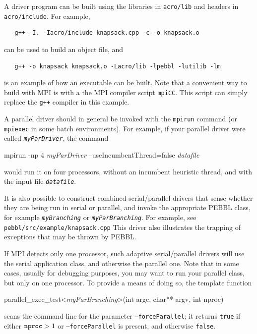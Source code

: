 A driver program can be built using the libraries in \texttt{acro/lib}
and headers in \texttt{acro/include}.  For example, 
\begin{verbatim}
   g++ -I. -Iacro/include knapsack.cpp -c -o knapsack.o
\end{verbatim}
can be used to build an object file, and 
\begin{verbatim}
   g++ -o knapsack knapsack.o -Lacro/lib -lpebbl -lutilib -lm
\end{verbatim}
is an example of how an executable can be built.  Note that a convenient
way to build with MPI is with a the MPI compiler script \texttt{mpiCC}.  This 
script can simply replace the \texttt{g++} compiler in this example.

A parallel driver should in general be invoked with the
\texttt{mpirun} command (or \texttt{mpiexec} in some batch
environments).  For example, if your parallel driver were called
\texttt{\emph{myParDriver}}, the command
\begin{codeblock}
mpirun -np 4 \emph{myParDriver} --useIncumbentThread=false \emph{datafile}
\end{codeblock}
would run it on four processors, without an incumbent heuristic
thread, and with the input file \texttt{\emph{datafile}}.

It is also possible to construct combined serial/parallel drivers that
sense whether they are being run in serial or parallel, and invoke the
appropriate PEBBL class, for example \texttt{\emph{myBranching}} or
\texttt{\emph{myParBranching}}.  For example, see
\texttt{pebbl/src/example/\linebreak[0]knapsack.cpp}
This driver also illustrates the
trapping of exceptions that may be thrown by PEBBL.

If MPI detects only one processor,
such adaptive serial/parallel 
drivers will use the serial application class, and otherwise the
parallel one.  Note that in some cases, usually for debugging
purposes, you may want to run your parallel class, but only on one
processor.  To provide a means of doing so, the template function 
\begin{codeblock}
parallel\_exec\_test<\emph{myParBranching}>(int argc, char** argv, int
nproc)
\end{codeblock}
scans the command line for the parameter \texttt{--forceParallel}; it
returns \texttt{true} if either $\text{\texttt{nproc}} > 1$ or
\texttt{--forceParallel} is present, and otherwise \texttt{false}.
